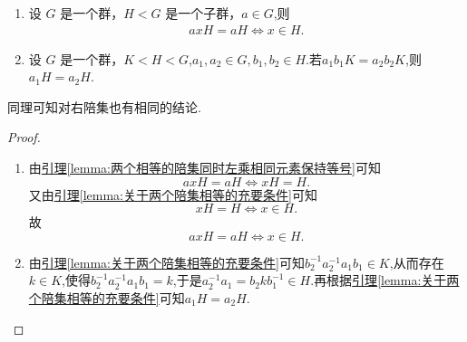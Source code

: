 \documentclass[../../main.tex]{subfiles}
\begin{document}
\begin{corollary}\label{corollary:关于两个陪集相等的充要条件推论}
\begin{enumerate}[(1)]
\item 设 \(G\) 是一个群，\(H < G\) 是一个子群，\(a \in G\),则
\begin{align*}
axH=aH \iff x\in H.
\end{align*}

\item 设 \(G\) 是一个群，$K<H<G$,$a_1,a_2\in G,b_1,b_2 \in H$.若$a_1b_1K=a_2b_2K$,则$a_1H=a_2H$.
\end{enumerate}
\end{corollary}
\begin{note}
同理可知对右陪集也有相同的结论.
\end{note}
\begin{proof}
\begin{enumerate}[(1)]
\item 由\hyperref[lemma:两个相等的陪集同时左乘相同元素保持等号]{引理\ref{lemma:两个相等的陪集同时左乘相同元素保持等号}}可知\[axH=aH \iff xH=H.\]
又由\hyperref[lemma:关于两个陪集相等的充要条件]{引理\ref{lemma:关于两个陪集相等的充要条件}}可知\[xH=H \iff x\in H.\]故\[axH=aH \iff x\in H.\]

\item 由\hyperref[lemma:关于两个陪集相等的充要条件]{引理\ref{lemma:关于两个陪集相等的充要条件}}可知$b_{2}^{-1}a_{2}^{-1}a_1b_1\in K$,从而存在$k\in K$,使得$b_{2}^{-1}a_{2}^{-1}a_1b_1=k$,于是$a_2^{-1}a_1=b_2kb_{1}^{-1}\in H.$再根据\hyperref[lemma:关于两个陪集相等的充要条件]{引理\ref{lemma:关于两个陪集相等的充要条件}}可知$a_1H=a_2H.$
\end{enumerate}

\end{proof}
\end{document}
